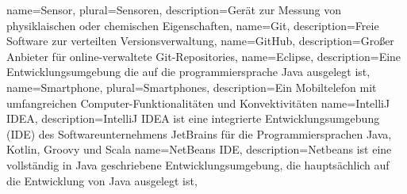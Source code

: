 \makenoidxglossaries
{}
{
	name=Sensor,
	plural=Sensoren,
	description={Gerät zur Messung von physiklaischen oder chemischen Eigenschaften},
}
{
	name=Git,
	description={Freie Software zur verteilten Versionsverwaltung},
}
{
	name=GitHub,
	description={Großer Anbieter für online-verwaltete Git-Repositories},
}
{
	name=Eclipse,
	description={Eine Entwicklungsumgebung die auf die programmiersprache Java ausgelegt ist},
}
{
	name=Smartphone,
	plural=Smartphones,
	description={Ein Mobiltelefon mit umfangreichen Computer-Funktionalitäten und Konvektivitäten}
}
{
	name=IntelliJ IDEA,
	description={IntelliJ IDEA ist eine integrierte Entwicklungsumgebung (IDE) des Softwareunternehmens JetBrains für die Programmiersprachen Java, Kotlin, Groovy und Scala}
}
{
	name=NetBeans IDE,
	description={Netbeans ist eine vollständig in Java geschriebene Entwicklungsumgebung, die hauptsächlich auf die Entwicklung von Java ausgelegt ist},
}